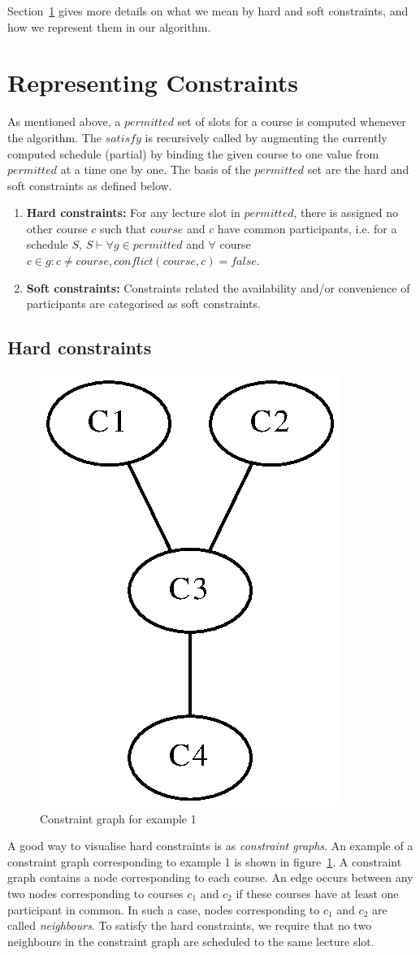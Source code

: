 \documentclass[11pt,a4paper]{article}
\begin{document}
Section~\ref{sec:cons} gives more details on what we mean by hard and soft constraints, and how we represent them in our algorithm.

\section{Representing Constraints} \label{sec:cons}
As mentioned above, a $permitted$ set of slots for a course is computed whenever the algorithm. The $satisfy$ is recursively called by augmenting the currently computed schedule (partial) by binding the given course to one value from $permitted$ at a time one by one. The basis of the $permitted$ set are the hard and soft constraints as defined below.
\begin{enumerate}
	\item \textbf{Hard constraints: }For any lecture slot in $permitted$, there is assigned no other course $c$ such that $course$ and $c$ have common participants, i.e. for a schedule $S$, $S \vdash \forall g \in permitted$ and $\forall $ course $c \in g : c \neq course, conflict(course, c) = false$.
	\item \textbf{Soft constraints: }Constraints related the availability and/or convenience of participants are categorised as soft constraints.
\end{enumerate}
 
\subsection{Hard constraints}
\begin{figure}
\begin{center}
\includegraphics[width=.25\textwidth]{images/cg1.eps}
\end{center}
\caption{Constraint graph for example 1}
\label{fig:cg1}
\end{figure} 

A good way to visualise hard constraints is as \emph{constraint graphs}. An example of a constraint graph corresponding to example 1 is shown in figure~\ref{fig:cg1}. A constraint graph contains a node corresponding to each course. An edge occurs between any two nodes corresponding to courses $c_1$ and $c_2$ if these courses have at least one participant in common. In such a case, nodes corresponding to $c_1$ and $c_2$ are called \emph{neighbours}. To satisfy the hard constraints, we require that no two neighbours  in the constraint graph are scheduled to the same lecture slot.
\end{document}
